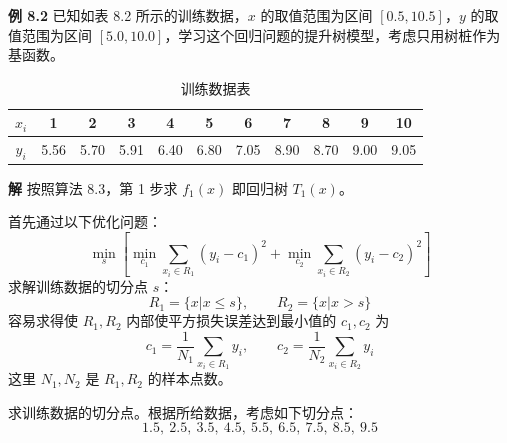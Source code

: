 \documentclass[UTF8, 12pt, fontset=fandol, oneside]{ctexart}
\begin{document}
\begin{center}
\end{center}

\noindent\textbf{例 8.2}\quad
已知如表 8.2 所示的训练数据，$x$ 的取值范围为区间 $[0.5,10.5]$，$y$ 的取值范围为区间 $[5.0,10.0]$，学习这个回归问题的提升树模型，考虑只用树桩作为基函数。

\begin{table}[htbp]
\centering
\caption{训练数据表}
\begin{tabular}{c*{10}{c}}
\toprule
$x_i$ & 1 & 2 & 3 & 4 & 5 & 6 & 7 & 8 & 9 & 10\\
\midrule
$y_i$ & 5.56 & 5.70 & 5.91 & 6.40 & 6.80 & 7.05 & 8.90 & 8.70 & 9.00 & 9.05\\
\bottomrule
\end{tabular}
\end{table}

\noindent\textbf{解}\quad
按照算法 8.3，第 1 步求 $f_1(x)$ 即回归树 $T_1(x)$。

首先通过以下优化问题：
\[
\min_s\left[
\min_{c_1}\sum_{x_i\in R_1}(y_i-c_1)^2
+\min_{c_2}\sum_{x_i\in R_2}(y_i-c_2)^2
\right]
\]
求解训练数据的切分点 $s$：
\[
R_1=\{x|x\leq s\},\qquad R_2=\{x|x>s\}
\]
容易求得使 $R_1,R_2$ 内部使平方损失误差达到最小值的 $c_1,c_2$ 为
\[
c_1=\frac{1}{N_1}\sum_{x_i\in R_1}y_i,\qquad
c_2=\frac{1}{N_2}\sum_{x_i\in R_2}y_i
\]
这里 $N_1,N_2$ 是 $R_1,R_2$ 的样本点数。

求训练数据的切分点。根据所给数据，考虑如下切分点：
\[
1.5,\ 2.5,\ 3.5,\ 4.5,\ 5.5,\ 6.5,\ 7.5,\ 8.5,\ 9.5
\]
\end{document}
